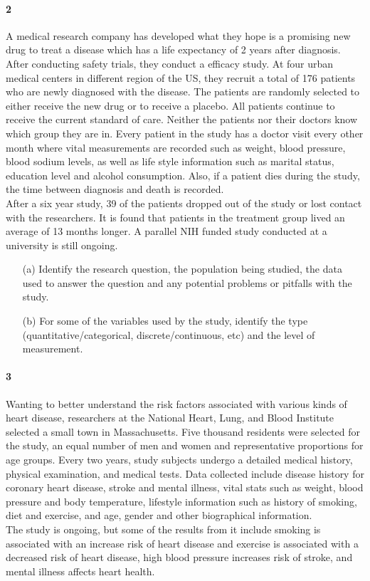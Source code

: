 \documentclass{article}
\begin{document}
\begin{flushleft}
\paragraph{2} A medical research company has developed what they hope is a promising new drug to treat a disease which has a life expectancy of 2 years after diagnosis. After conducting safety trials, they conduct a efficacy study. At four urban medical centers in different region of the US, they recruit a total of 176 patients who are newly diagnosed with the disease. The patients are randomly selected to either receive the new drug or to receive a placebo. All patients continue to receive the current standard of care. Neither the patients nor their doctors know which group they are in. Every patient in the study has a doctor visit every other month where vital measurements are recorded such as weight, blood pressure, blood sodium levels, as well as life style information such as marital status, education level and alcohol consumption. Also, if a patient dies during the study, the time between diagnosis and death is recorded.\\
\medskip
After a six year study, 39 of the patients dropped out of the study or lost contact with the researchers. It is found that patients in the treatment group lived an average of 13 months longer. A parallel NIH funded study conducted at a university is still ongoing.

\begin{itemize}
\item [(a)] Identify the research question, the population being studied, the data used to answer the question and any potential problems or pitfalls with the study.
\vspace{2.5in}
\item[(b)] For some of the variables used by the study, identify the type (quantitative/categorical, discrete/continuous, etc) and the level of measurement.
\end{itemize}


\newpage
\paragraph{3} Wanting to better understand the risk factors associated with various kinds of heart disease, researchers at the National Heart, Lung, and Blood Institute selected a small town in Massachusetts. Five thousand residents were selected for the study, an equal number of men and women and representative proportions for age groups. Every two years, study subjects undergo a detailed medical history, physical examination, and medical tests. Data collected include disease history for coronary heart disease, stroke and mental illness, vital stats such as weight, blood pressure and body temperature, lifestyle information such as history of smoking, diet and exercise, and age, gender and other biographical information.\\
\medskip
The study is ongoing, but some of the results from it include smoking is associated with an increase risk of heart disease and exercise is associated with a decreased risk of heart disease, high blood pressure increases risk of stroke, and mental illness affects heart health.


\end{flushleft}
\end{document}
